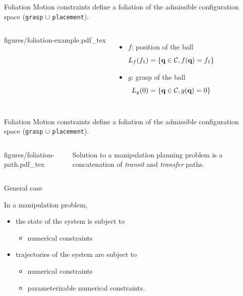 \begin {frame} {Foliation}
  Motion constraints define a foliation of the admissible configuration space (\texttt{grasp} $\cup$ \texttt{placement}).
  \begin{columns}
    \centering
    \def\svgwidth {\linewidth}
                  {\tiny
                    \graphicspath{{./figures/}}
                     {figures/foliation-example.pdf_tex}
                }
    \centering
    \begin{itemize}
    \item $f$: position of the ball
      $$L_{f}(f_1) = \left\{\textbf{q}\in{\cal C}, f (\textbf{q}) = f_1 \right\}$$
    \item $g$: grasp of the ball
      $$L_{g}(0) = \left\{\textbf{q}\in{\cal C}, g (\textbf{q}) = 0 \right\}$$
    \end{itemize}
  \end {columns}

\end {frame}

%
%

\begin {frame} {Foliation}
  Motion constraints define a foliation of the admissible configuration space (\texttt{grasp} $\cup$ \texttt{placement}).
  \begin{columns}
    \centering
    \def\svgwidth {\linewidth}
                  {\tiny
                    \graphicspath{{./figures/}}
                     {figures/foliation-path.pdf_tex}
                }
    \centering
    Solution to a manipulation planning problem is a concatenation of \textit{transit} and \textit{transfer} paths.
  \end {columns}

\end {frame}

%
%

\begin {frame} {General case}

  In a manipulation problem,
  \begin{itemize}
  \item the state of the system is subject to
    \begin {itemize}
      \item numerical constraints
    \end {itemize}
    \pause
  \item trajectories of the system are subject to
    \begin {itemize}
    \item numerical constraints
    \item parameterizable numerical constraints.
    \end {itemize}
  \end{itemize}
\end {frame}

